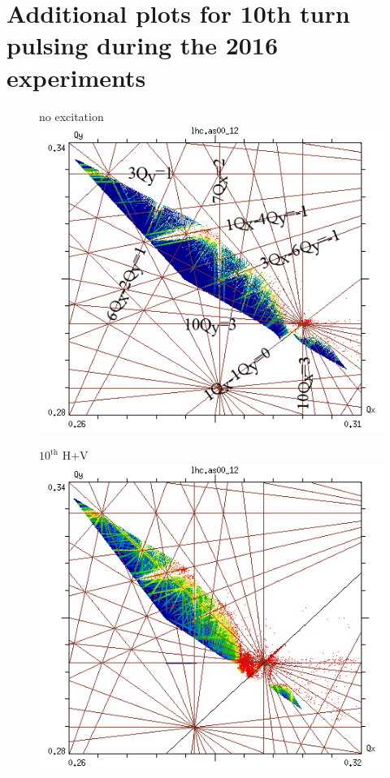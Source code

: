 \documentclass[%
 reprint,
 amsmath,amssymb,
 aps,
prstab,
]{revtex4-1}
\begin{document}
\section{Additional plots for 10th turn pulsing during the 2016 experiments}
\label{app:sec:10}
\begin{figure}[h]
	\begin{minipage}[t]{0.49\linewidth}
		\centering
		no excitation
		\includegraphics[width=1.0\linewidth]{2016injnocolc15o+19_6noerru_dp0_ord10_annotate.png}
	\end{minipage}
	\begin{minipage}[t]{0.49\linewidth}
		\centering
		$10^{\mathrm{th}}$ H+V
		\includegraphics[width=1.0\linewidth]{2016injnocolc15o+19_6noerrut10skhv_dp0_ord10.png}

\end{minipage}
\end{figure}
\end{document}
